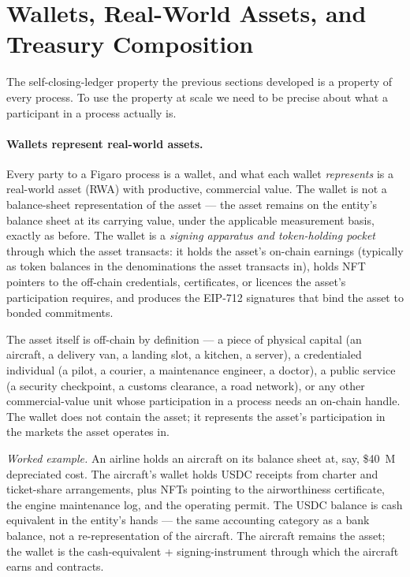 \documentclass[11pt,a4paper]{article}
\theoremstyle{definition}
\theoremstyle{remark}
\begin{document}
\section{Wallets, Real-World Assets, and Treasury Composition}
\label{sec:treasury-composition}

The self-closing-ledger property the previous sections developed
is a property of every process. To use the property at scale we
need to be precise about what a participant in a process actually
is.

\paragraph{Wallets represent real-world assets.}
Every party to a Figaro process is a wallet, and what each
wallet \emph{represents} is a real-world asset (RWA) with
productive, commercial value. The wallet is not a
balance-sheet representation of the asset --- the asset
remains on the entity's balance sheet at its carrying value,
under the applicable measurement basis, exactly as before.
The wallet is a \emph{signing apparatus and token-holding
pocket} through which the asset transacts: it holds the
asset's on-chain earnings (typically as token balances in the
denominations the asset transacts in), holds NFT pointers to
the off-chain credentials, certificates, or licences the
asset's participation requires, and produces the EIP-712
signatures that bind the asset to bonded commitments.

The asset itself is off-chain by definition --- a piece of
physical capital (an aircraft, a delivery van, a landing slot,
a kitchen, a server), a credentialed individual (a pilot, a
courier, a maintenance engineer, a doctor), a public service
(a security checkpoint, a customs clearance, a road network),
or any other commercial-value unit whose participation in a
process needs an on-chain handle. The wallet does not contain
the asset; it represents the asset's participation in the
markets the asset operates in.

\emph{Worked example.} An airline holds an aircraft on its
balance sheet at, say, \$40~M depreciated cost. The aircraft's
wallet holds USDC receipts from charter and ticket-share
arrangements, plus NFTs pointing to the airworthiness
certificate, the engine maintenance log, and the operating
permit. The USDC balance is cash equivalent in the entity's
hands --- the same accounting category as a bank balance, not
a re-representation of the aircraft. The aircraft remains the
asset; the wallet is the cash-equivalent + signing-instrument
through which the aircraft earns and contracts.
\end{document}
